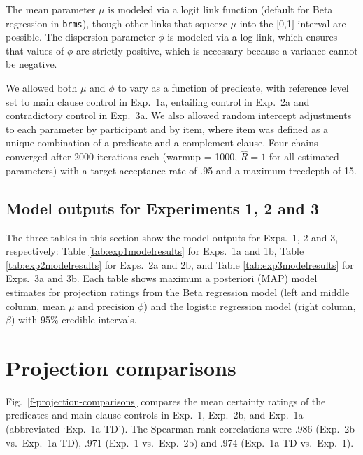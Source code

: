 \documentclass[11pt,fleqn]{article}
\newcommand{\figref}[1]{Fig.~\ref{#1}}
\newcommand{\6}{\mbox{$[\hspace*{-.6mm}[$}}
\newcommand{\9}{\mbox{$]\hspace*{-.6mm}]$}}
\begin{document}
The mean parameter $\mu$ is modeled via a logit link function (default for Beta regression in \verb|brms|), though other links that squeeze $\mu$ into the $[$0,1$]$ interval are possible. The dispersion parameter $\phi$ is modeled via a log link, which ensures that values of $\phi$ are strictly positive, which is necessary because a variance cannot be negative. 

We allowed both $\mu$ and $\phi$ to vary as a function of predicate, with reference level set to main clause control in Exp.~1a, entailing control in Exp.~2a and contradictory control in Exp.~3a. We also allowed random intercept adjustments to each parameter by participant and by item, where item was defined as a unique combination of a predicate and a complement clause. Four chains converged after 2000 iterations each (warmup = 1000, \(\hat{R}=1\) for all estimated parameters) with a target acceptance rate of .95 and a maximum treedepth of 15.

\subsection{Model outputs for Experiments 1, 2 and 3}\label{a-mo}

The three tables in this section show the model outputs for Exps.~1, 2 and 3, respectively: Table \ref{tab:exp1modelresults} for Exps.~1a and 1b, Table \ref{tab:exp2modelresults} for Exps.~2a and 2b, and Table \ref{tab:exp3modelresults} for Exps.~3a and 3b. Each table shows maximum a posteriori (MAP) model estimates for projection ratings from the Beta regression model (left and middle column, mean $\mu$ and precision $\phi$) and the logistic regression model (right column, $\beta$)  with 95\% credible intervals.

\section{Projection comparisons}\label{a-comparison}

\figref{f-projection-comparisons} compares the mean certainty ratings of the predicates and main clause controls in Exp.~1, Exp.~2b, and  Exp.~1a (abbreviated `Exp.~1a TD'). The Spearman rank correlations were .986 (Exp.~2b vs.\ Exp.~1a TD), .971 (Exp.~1 vs.\ Exp.~2b) and .974 (Exp.~1a TD vs.\  Exp.~1).
\end{document}
